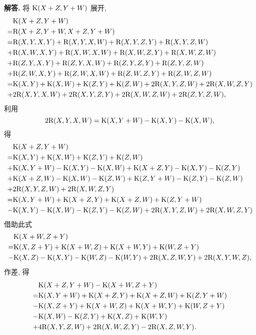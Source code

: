 \documentclass{ctexart}
\newenvironment{solution}{\par\noindent\textbf{解答. }}{\par}
\begin{document}
\begin{solution}
    将 $\mathrm{K}(X + Z, Y + W)$ 展开,
    \[
        \begin{aligned}
             & \mathrm{K}(X + Z, Y + W) \\
            =& \mathrm{R}(X + Z, Y + W, X + Z, Y + W) \\
            =& \mathrm{R}(X, Y, X, Y) + \mathrm{R}(X, Y, X, W) + \mathrm{R}(X, Y, Z, Y) + \mathrm{R}(X, Y, Z, W) \\
            +& \mathrm{R}(X, W, X, Y) + \mathrm{R}(X, W, X, W) + \mathrm{R}(X, W, Z, Y) + \mathrm{R}(X, W, Z, W) \\
            +& \mathrm{R}(Z, Y, X, Y) + \mathrm{R}(Z, Y, X, W) + \mathrm{R}(Z, Y, Z, Y) + \mathrm{R}(Z, Y, Z, W) \\
            +& \mathrm{R}(Z, W, X, Y) + \mathrm{R}(Z, W, X, W) + \mathrm{R}(Z, W, Z, Y) + \mathrm{R}(Z, W, Z, W) \\
            =& \mathrm{K}(X, Y) + \mathrm{K}(X, W) + \mathrm{K}(Z, Y) + \mathrm{K}(Z, W) + 2\mathrm{R}(X, Y, Z, W) + 2\mathrm{R}(X, W, Z, Y) \\
            +& 2\mathrm{R}(X, Y, X, W) + 2\mathrm{R}(X, Y, Z, Y) +2\mathrm{R}(X, W, Z, W) + 2\mathrm{R}(Z, Y, Z, W), 
        \end{aligned}
    \]
    利用
    \[
        2\mathrm{R}(X, Y, X, W) = \mathrm{K}(X, Y + W) - \mathrm{K}(X, Y) - \mathrm{K}(X, W),
    \]
    得
    \[
        \begin{aligned}
             & \mathrm{K}(X + Z, Y + W) \\
            =& \mathrm{K}(X, Y) + \mathrm{K}(X, W) + \mathrm{K}(Z, Y) + \mathrm{K}(Z, W) \\
            +& \mathrm{K}(X, Y + W) - \mathrm{K}(X, Y) - \mathrm{K}(X, W) + \mathrm{K}(X + Z, Y) - \mathrm{K}(X, Y) - \mathrm{K}(Z, Y) \\
            +& \mathrm{K}(X + Z, W) - \mathrm{K}(X, W) - \mathrm{K}(Z, W) + \mathrm{K}(Z, Y + W) - \mathrm{K}(Z, Y) - \mathrm{K}(Z, W) \\
            +& 2\mathrm{R}(X, Y, Z, W) + 2\mathrm{R}(X, W, Z, Y) \\
            =& \mathrm{K}(X, Y + W) + \mathrm{K}(X + Z, Y) + \mathrm{K}(X + Z, W) + \mathrm{K}(Z, Y + W) \\
            -& \mathrm{K}(X, Y) - \mathrm{K}(X, W) - \mathrm{K}(Z, Y) - \mathrm{K}(Z, W) + 2\mathrm{R}(X, Y, Z, W) + 2\mathrm{R}(X, W, Z, Y)
       \end{aligned}
    \]
    借助此式
    \[
        \begin{aligned}
             & \mathrm{K}(X + W, Z + Y) \\
            =& \mathrm{K}(X, Z + Y) + \mathrm{K}(X + W, Z) + \mathrm{K}(X + W, Y) + \mathrm{K}(W, Z + Y) \\
            -& \mathrm{K}(X, Z) - \mathrm{K}(X, Y) - \mathrm{K}(W, Z) - \mathrm{K}(W, Y) + 2\mathrm{R}(X, Z, W, Y) + 2\mathrm{R}(X, Y, W, Z),
        \end{aligned}
    \]
    作差, 得
    \[
        \begin{aligned}
             & \mathrm{K}(X + Z, Y + W) - \mathrm{K}(X + W, Z + Y) \\
            =& \mathrm{K}(X, Y + W) + \mathrm{K}(X + Z, Y) + \mathrm{K}(X + Z, W) + \mathrm{K}(Z, Y + W) \\
            -& \mathrm{K}(X, Z + Y) + \mathrm{K}(X + W, Z) + \mathrm{K}(X + W, Y) + \mathrm{K}(W, Z + Y) \\
            -& \mathrm{K}(X, W) - \mathrm{K}(Z, Y) + \mathrm{K}(X, Z) + \mathrm{K}(W, Y) \\
            +& 4\mathrm{R}(X, Y, Z, W) + 2\mathrm{R}(X, W, Z, Y) - 2\mathrm{R}(X, Z, W, Y).
        \end{aligned}
    \]


\end{solution}
\end{document}
